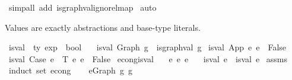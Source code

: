 \begin{isabellebody}
\ {\isacharparenleft}{\kern0pt}simp{\isacharunderscore}{\kern0pt}all\ add{\isacharcolon}{\kern0pt}\ is{\isacharunderscore}{\kern0pt}graph{\isacharunderscore}{\kern0pt}val{\isacharunderscore}{\kern0pt}ignore{\isacharunderscore}{\kern0pt}lmap{\isacharparenright}{\kern0pt}\isanewline
{}\isamarkupfalse%
\ auto%
\endisatagproof
{\isafoldproof}%
%
\isadelimproof
%
\endisadelimproof
%
\begin{isamarkuptext}%
Values are exactly abstractions and base-type literals.%
\end{isamarkuptext}\isamarkuptrue%
\isamarkupfalse%
\ is{\isacharunderscore}{\kern0pt}val\ {\isacharcolon}{\kern0pt}{\isacharcolon}{\kern0pt}\ {\isachardoublequoteopen}{\isacharprime}{\kern0pt}ty\ exp\ {\isacharequal}{\kern0pt}{\isachargreater}{\kern0pt}\ bool{\isachardoublequoteclose}\ \isanewline
\ \ {\isachardoublequoteopen}is{\isacharunderscore}{\kern0pt}val\ {\isacharparenleft}{\kern0pt}Graph\ g{\isacharparenright}{\kern0pt}\ {\isacharequal}{\kern0pt}\ is{\isacharunderscore}{\kern0pt}graph{\isacharunderscore}{\kern0pt}val\ g{\isachardoublequoteclose}\isanewline
{\isacharbar}{\kern0pt}\ {\isachardoublequoteopen}is{\isacharunderscore}{\kern0pt}val\ {\isacharparenleft}{\kern0pt}App\ e{}\ e{}{\isacharparenright}{\kern0pt}\ {\isacharequal}{\kern0pt}\ False{\isachardoublequoteclose}\isanewline
{\isacharbar}{\kern0pt}\ {\isachardoublequoteopen}is{\isacharunderscore}{\kern0pt}val\ {\isacharparenleft}{\kern0pt}Case\ e{}\ {\isasymGamma}\ T\ e{}\ e{}{\isacharparenright}{\kern0pt}\ {\isacharequal}{\kern0pt}\ False{\isachardoublequoteclose}\isanewline
\isanewline
\isanewline
{}\isamarkupfalse%
\ econg{\isacharunderscore}{\kern0pt}is{\isacharunderscore}{\kern0pt}val{\isacharcolon}{\kern0pt}\isanewline
\ \ \ {\isachardoublequoteopen}e{}\ {\isasymsimeq}e\ e{}{\isachardoublequoteclose}\isanewline
\ \ \ {\isachardoublequoteopen}is{\isacharunderscore}{\kern0pt}val\ e{}\ {\isacharequal}{\kern0pt}\ is{\isacharunderscore}{\kern0pt}val\ e{}{\isachardoublequoteclose}\isanewline
%
\isadelimproof
%
\endisadelimproof
%
\isatagproof
{}\isamarkupfalse%
\ assms\isanewline
{}\isamarkupfalse%
\ {\isacharparenleft}{\kern0pt}induct\ set{\isacharcolon}{\kern0pt}\ econg{\isacharparenright}{\kern0pt}\isanewline
\ \ \isamarkupfalse%
\ {\isacharparenleft}{\kern0pt}e{\isacharunderscore}{\kern0pt}Graph\ g\ g{\isacharprime}{\kern0pt}{\isacharparenright}{\kern0pt}\isanewline

\end{isabellebody}
